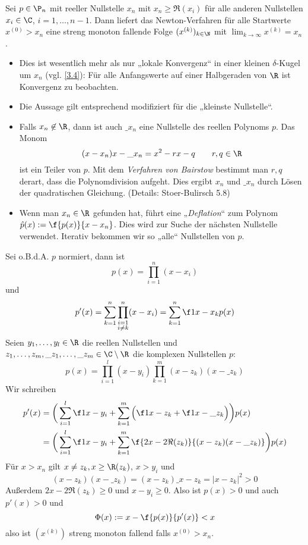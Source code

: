 \documentclass[11pt]{scrartcl}
\begin{document}
\begin{st} \label{3.7}
	Sei $p\in \P_n$ mit reeller Nullstelle $x_n$ mit $x_n \ge \Re(x_i)$ für alle anderen Nullstellen $x_i \in \C$, $i=1,\dotsc,n-1$.
	Dann liefert das Newton-Verfahren für alle Startwerte $x^{(0)} > x_n$ eine streng monoton fallende Folge $(x^{(k)})_{k\in\N}$ mit $\lim_{k\to\infty} x^{(k)} = x_n$.
	\begin{note}
		\begin{itemize}
			\item
				Dies ist wesentlich mehr als nur „lokale Konvergenz“ in einer kleinen $\delta$-Kugel um $x_n$ (vgl. \ref{3.4}):
				Für alle Anfangswerte auf einer Halbgeraden von $\R$ ist Konvergenz zu beobachten.
			\item
				Die Aussage gilt entsprechend modifiziert für die „kleinste Nullstelle“.
			\item
				Falls $x_n \not\in \R$, dann ist auch $\_{x_n}$ eine Nullstelle des reellen Polynoms $p$.
				Das Monom
				\[
					(x-x_n){x-\_{x_n}} = x^2 - rx - q
					\qquad r,q \in \R
				\]
				ist ein Teiler von $p$.
				Mit dem \emph{Verfahren von Bairstow} bestimmt man $r,q$ derart, dass die Polynomdivision aufgeht.
				Dies ergibt $x_n$ und $\_{x_n}$ durch Lösen der quadratischen Gleichung.
				(Details: Stoer-Bulirsch 5.8)
			\item
				Wenn man $x_n \in \R$ gefunden hat, führt eine „\emph{Deflation}“ zum Polynom $\hat p(x) := \f {p(x)}{x-x_n}$.
				Dies wird zur Suche der nächsten Nullstelle verwendet.
				Iterativ bekommen wir so „alle“ Nullstellen von $p$.
		\end{itemize}
	\end{note}
	\begin{note}
		Sei o.B.d.A. $p$ normiert, dann ist
		\[
			p(x) = \prod_{i=1}^n (x-x_i)
		\]
		und
		\[
			p'(x) = \sum_{k=1}^n \prod_{\substack{i=1 \\ i\neq k}}^n (x-x_i) = \sum_{k=1}^n \f 1{x-x_k} p(x)
		\]
		Seien $y_1,\dotsc,y_l \in \R$ die reellen Nullstellen und $z_1,\dotsc,z_m,\_{z_1}, \dotsc, \_{z_m} \in \C \setminus \R$ die komplexen Nullstellen $p$:
		\[
			p(x) = \prod_{i=1}^l (x-y_i)\prod_{k=1}^m (x-z_k)(x-\_{z_k})
		\]
		Wir schreiben
		\begin{align*}
			p'(x)  
			&= \bigg( \sum_{i=1}^l \f 1{x-y_i} + \sum_{k=1}^m \Big(\f 1{x-z_k} + \f 1{x-\_{z_k}}\Big) \bigg) p(x) \\
			&= \bigg( \sum_{i=1}^l \f 1{x-y_i} + \sum_{k=1}^m \f {2x - 2\Re(z_k)}{(x-z_k)(x-\_{z_k})}\bigg) p(x)
		\end{align*}
		Für $x>x_n$ gilt $x\neq z_k, x\ge \R(z_k)$, $x > y_i$ und
		\[
			(x-z_k)(x-\_{z_k}) 
			= (x-z_k){\_{x-z_k}}
			= |x-z_k|^2
			> 0
		\]
		Außerdem $2x-2\Re(z_k) \ge 0$ und $x-y_i \ge 0$.
		Also ist $p(x) > 0$ und auch $p'(x) > 0$ und
		\[
			\Phi(x) := x - \f {p(x)}{p'(x)} < x
		\]
		also ist $(x^{(k)})$ streng monoton fallend falls $x^{(0)} > x_n$.


\end{note}
\end{st}
\end{document}
